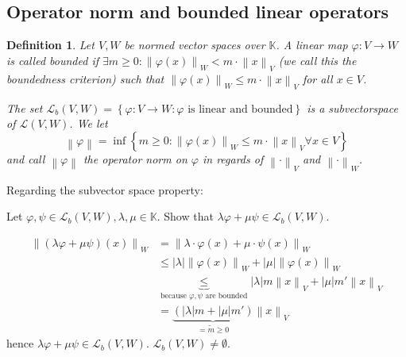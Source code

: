 \documentclass{article}
\newtheorem{definition}{Definition}  \numberwithin{definition}{section}
\newcommand{\set}[1]{\left\{#1\right\}}
\newcommand{\norm}[1]{\left\|#1\right\|}
\newcommand{\card}[1]{\left|#1\right|}
\begin{document}
\subsection{Operator norm and bounded linear operators}

\begin{definition} %
  \label{opdef}
  Let $V, W$ be normed vector spaces over $\mathbb K$. A linear map $\varphi: V \to W$ is called \emph{bounded} if $\exists m \geq 0: \norm{\varphi(x)}_W < m \cdot \norm{x}_V$ (we call this the \emph{boundedness criterion})
  such that $\norm{\varphi(x)}_W \leq m \cdot \norm{x}_V$ for all $x \in V$.

  The set $\mathcal L_b(V, W) = \set{\varphi: V \to W: \varphi \text{ is linear and bounded}}$ is a subvectorspace of $\mathcal L(V, W)$. We let
  \[ \norm{\varphi} = \inf\set{m \geq 0: \norm{\varphi(x)}_W \leq m \cdot \norm{x}_V \forall x \in V} \]
  and call $\norm{\varphi}$ the \emph{operator norm} on $\varphi$ in regards of $\norm{\cdot}_V$ and $\norm{\cdot}_W$.
\end{definition}

Regarding the subvector space property:

Let $\varphi, \psi \in \mathcal L_b(V, W), \lambda, \mu \in \mathbb K$.
Show that $\lambda \varphi + \mu \psi \in \mathcal L_b(V, W)$.

\begin{align*}
  \norm{(\lambda \varphi + \mu \psi)(x)}_W
    &= \norm{\lambda \cdot \varphi(x) + \mu \cdot \psi(x)}_W \\
    &\leq \card{\lambda} \norm{\varphi(x)}_W + \card{\mu} \norm{\varphi(x)}_W \\
    &\underbrace{\leq}_{\text{because } \varphi, \psi \text{ are bounded}} \card{\lambda} m \norm{x}_V + \card{\mu} m' \norm{x}_V \\
    &= \underbrace{\left(\card{\lambda} m + \card{\mu} m'\right)}_{= \tilde m \geq 0} \norm{x}_V
\end{align*}
hence $\lambda \varphi + \mu \psi \in \mathcal L_b(V, W)$.
$\mathcal L_b(V, W) \neq \emptyset$.
\end{document}
